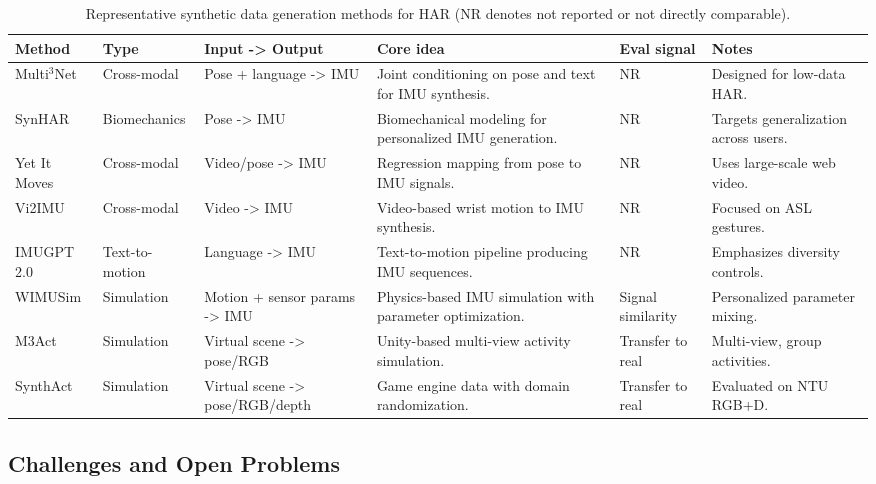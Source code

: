 \begin{table}[t]
  \centering
  \footnotesize
  \caption{Representative synthetic data generation methods for HAR (NR denotes not reported or not directly comparable).}
  \label{tab:synthetic-methods}
  \begin{tabular}{l l l p{3.6cm} p{2.6cm} p{2.8cm}}
    \toprule
    \textbf{Method} & \textbf{Type} & \textbf{Input -> Output} & \textbf{Core idea} & \textbf{Eval signal} & \textbf{Notes} \\
    \midrule
    Multi$^3$Net \cite{fortes2024enhancing} & Cross-modal & Pose + language -> IMU & Joint conditioning on pose and text for IMU synthesis. & NR & Designed for low-data HAR. \\
    SynHAR \cite{uhlenberg2024synhar} & Biomechanics & Pose -> IMU & Biomechanical modeling for personalized IMU generation. & NR & Targets generalization across users. \\
    Yet It Moves \cite{rey2020yet} & Cross-modal & Video/pose -> IMU & Regression mapping from pose to IMU signals. & NR & Uses large-scale web video. \\
    Vi2IMU \cite{santhalingam2023synthetic} & Cross-modal & Video -> IMU & Video-based wrist motion to IMU synthesis. & NR & Focused on ASL gestures. \\
    IMUGPT 2.0 \cite{leng2024imugpt} & Text-to-motion & Language -> IMU & Text-to-motion pipeline producing IMU sequences. & NR & Emphasizes diversity controls. \\
    WIMUSim \cite{oishi2025wimusim} & Simulation & Motion + sensor params -> IMU & Physics-based IMU simulation with parameter optimization. & Signal similarity & Personalized parameter mixing. \\
    M3Act \cite{chakma2023domain} & Simulation & Virtual scene -> pose/RGB & Unity-based multi-view activity simulation. & Transfer to real & Multi-view, group activities. \\
    SynthAct \cite{schneider2024synthact} & Simulation & Virtual scene -> pose/RGB/depth & Game engine data with domain randomization. & Transfer to real & Evaluated on NTU RGB+D. \\
    \bottomrule
  \end{tabular}
\end{table}


\subsection{Challenges and Open Problems}

